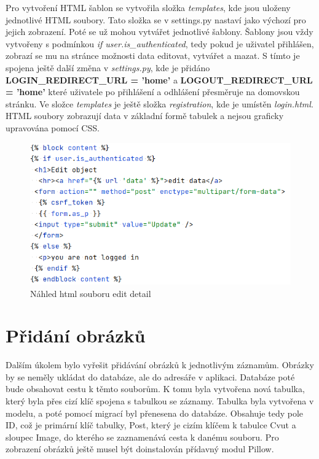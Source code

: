 Pro vytvoření HTML šablon se vytvořila složka \emph{templates}, kde
jsou uloženy jednotlivé HTML soubory. Tato složka se v settings.py
nastaví jako výchozí pro jejich zobrazení. Poté se už mohou vytvářet
jednotlivé šablony. Šablony jsou vždy vytvořeny s podmínkou \emph{if
  user.is\_authenticated}, tedy pokud je uživatel přihlášen, zobrazí
se mu na stránce možnosti data editovat, vytvářet a mazat. S tímto je
spojena ještě další změna v \emph{settings.py}, kde je přidáno
\textbf{LOGIN\_REDIRECT\_URL = 'home'} a \textbf{LOGOUT\_REDIRECT\_URL
  = 'home'} které uživatele po přihlášení a odhlášení přesměruje na
domovskou stránku. Ve složce \emph{templates} je ještě složka
\emph{registration}, kde je umístěn \emph{login.html}. HTML soubory
zobrazují data v základní formě tabulek a nejsou graficky upravována
pomocí CSS.

\begin{figure}[H] \centering
    \includegraphics[width=350pt]{./pictures/8-edit-detail-html.PNG}
    \caption[Náhled html souboru edit detail]{Náhled html souboru edit detail}
	\label{fig:Náhled HTML souboru edit detail}
\end{figure}


\newpage

\section{Přidání obrázků}

Dalším úkolem bylo vyřešit přidávání obrázků k jednotlivým
záznamům. Obrázky by se neměly ukládat do databáze, ale do adresáře v
aplikaci. Databáze poté bude obsahovat cestu k těmto souborům. K tomu
byla vytvořena nová tabulka, který byla přes cizí klíč spojena s
tabulkou se záznamy. Tabulka byla vytvořena v modelu, a poté pomocí
migrací byl přenesena do databáze. Obsahuje tedy pole ID, což je
primární klíč tabulky, Post, který je cizím klíčem k tabulce Cvut a
sloupec Image, do kterého se zaznamenává cesta k danému souboru.
Pro zobrazení obrázků ještě musel být doinstalován přídavný modul Pillow.

